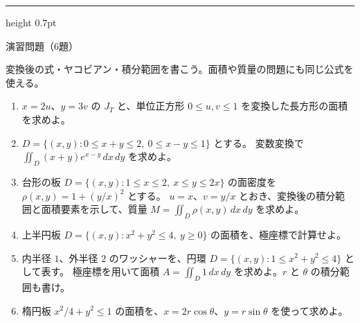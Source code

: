 \documentclass[a4paper,10pt,pdflatex,ja=standard,jafont=ipaex-type1,
  magstyle=real,scale=1]{bxjsarticle}
\newcommand{\topic}[1]{\par\vspace{5pt}%
  {\large\sffamily\mdseries\color{accent}#1}\par\vspace{2pt}}
\newenvironment{problems}
  {\begin{enumerate}[leftmargin=2em,itemsep=3pt,topsep=3pt,parsep=0pt,
    font=\color{accent}]}
  {\end{enumerate}}
\newcommand{\problemspace}{\par\vspace{5mm}}
\newcommand{\exercises}{%
  {\color{accent}\hrule height 0.7pt}\vspace{3pt}%
  \topic{演習問題（6題）}%
  {\small 変換後の式・ヤコビアン・積分範囲を書こう。面積や質量の問題にも同じ公式を使える。}\par}
\begin{document}
\begin{minipage}[b][\dimexpr0.5\textheight-\parskip\relax][t]{\linewidth}
\end{minipage}\par\nointerlineskip
\noindent\begin{minipage}[b][0.5\textheight][t]{\linewidth}
\exercises
\begin{problems}
\item $x=2u$、$y=3v$ の $J_T$ と、単位正方形 $0\le u,v\le1$ を変換した長方形の面積を求めよ。
\problemspace

\item $D=\{(x,y):0\le x+y\le2,\ 0\le x-y\le1\}$ とする。
変数変換で $\iint_D(x+y)e^{x-y}\,dx\,dy$ を求めよ。
\problemspace

\item 台形の板 $D=\{(x,y):1\le x\le2,\ x\le y\le2x\}$ の面密度を $\rho(x,y)=1+(y/x)^2$ とする。
$u=x$、$v=y/x$ とおき、変換後の積分範囲と面積要素を示して、質量 $M=\iint_D\rho(x,y)\,dx\,dy$ を求めよ。
\problemspace

\item 上半円板 $D=\{(x,y):x^2+y^2\le4,\ y\ge0\}$ の面積を、極座標で計算せよ。
\problemspace

\item 内半径 $1$、外半径 $2$ のワッシャーを、円環 $D=\{(x,y):1\le x^2+y^2\le4\}$ として表す。
極座標を用いて面積 $A=\iint_D1\,dx\,dy$ を求めよ。$r$ と $\theta$ の積分範囲も書け。
\problemspace

\item 楕円板 $x^2/4+y^2\le1$ の面積を、$x=2r\cos\theta$、$y=r\sin\theta$ を使って求めよ。
\problemspace

\end{problems}
\end{minipage}
\end{document}
